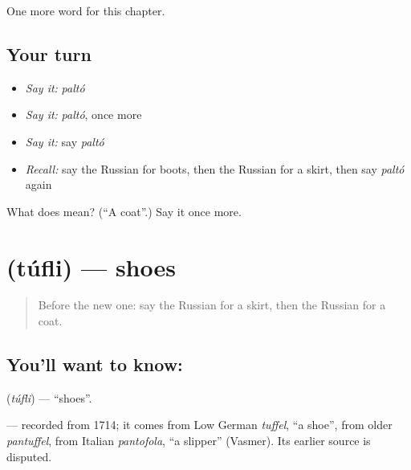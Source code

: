 \begin{grammarlens}[title={What you've built}]
One more word for this chapter.
\end{grammarlens}

\subsection*{Your turn}
\begin{itemize}
\raggedright
  \item \emph{Say it:} \emph{paltó}
  \item \emph{Say it:} \emph{paltó}, once more
  \item \emph{Say it:} say \emph{paltó}
  \item \emph{Recall:} say the Russian for boots, then the Russian for a skirt, then say \emph{paltó} again
\end{itemize}

\begin{tcolorbox}[breakable,colback=teal!4,colframe=teal!35!black,title={Before you move on}]
What does  mean? (\textquotedblleft{}A coat\textquotedblright{}.) Say it once more.
\end{tcolorbox}
\section[\texorpdfstring{\ru{туфли} (túfli)}{туфли (túfli)}]{ (túfli) — shoes}

\label{lesson:RU-C102-shoes}



\begin{quote}
Before the new one: say the Russian for a skirt, then the Russian for a coat.
\end{quote}

\subsection*{You'll want to know: }
\textbf{} (\emph{túfli}) — \textquotedblleft{}shoes\textquotedblright{}.

\begin{cousinweb}
\textbf{} — recorded from 1714; it comes from Low German \emph{tuffel}, \textquotedblleft{}a shoe\textquotedblright{}, from older \emph{pantuffel}, from Italian \emph{pantofola}, \textquotedblleft{}a slipper\textquotedblright{} (Vasmer). Its earlier source is disputed.
\end{cousinweb}


